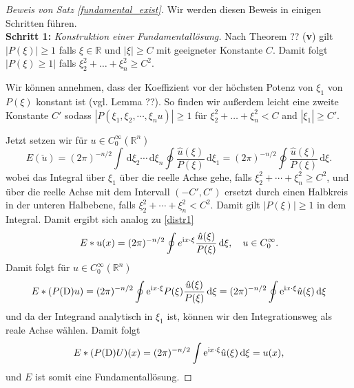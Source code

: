 \begin{proof}[Beweis von Satz \ref{fundamental_exist}]
Wir werden diesen Beweis in einigen Schritten führen.
\vspace{1mm}\\
\textbf{Schritt 1:} \emph{Konstruktion einer Fundamentallösung.}
Nach Theorem ?? ({\bf v}) gilt $|P(\xi)|\ge 1$ falls $\xi\in \mathbb R$ und $|\xi|\ge C$ mit geeigneter Konstante $C$.  Damit folgt $|P(\xi)\ge 1|$ falls $\xi_2^2+ \ldots + \xi_n^2 \ge C^2$.  

Wir können annehmen, dass der Koeffizient vor der höchsten Potenz von $\xi_1$ von $P(\xi)$ konstant ist (vgl. Lemma ??). 
So finden wir außerdem leicht eine zweite Konstante $C'$ sodass $|P(\xi_1, \xi_2, \cdots, \xi_nu)|\ge 1$ für $\xi_2^2+\ldots + \xi_n^2< C$ and $|\xi_1|\ge C'$.  

Jetzt setzen wir für $u\in C_0^\infty(\mathbb R^n)$
\begin{equation}\label{distr3}
E(\check u) = (2\pi)^{-n/2} \int \, \mathrm d\xi_2 \cdots \, \mathrm d\xi_n \oint \frac{\hat u(\xi)}{P(\xi)} \, \mathrm d\xi_1= (2\pi)^{-n/2} \oint \frac{\hat u(\xi)}{P(\xi)} \, \mathrm d\xi.
\end{equation}
wobei das Integral über $\xi_1$ über die reelle Achse gehe, falls $\xi_2^2+ \cdots + \xi_n^2 \ge C^2$, und über die reelle Achse mit dem Intervall $(-C', C')$ ersetzt durch einen Halbkreis in der unteren Halbebene, falls $\xi_2^2+ \cdots+ \xi_n^2 < C^2$. Damit gilt $|P(\xi)|\ge 1$  in dem Integral.  Damit ergibt sich analog zu \eqref{distr1}
\begin{equation}
E*u(x) = (2\pi)^{-n/2}\oint e^{\mathrm i x\cdot \xi } \frac{\hat u(\xi)}{P(\xi)}\, \mathrm d\xi, \quad u \in C_0^\infty.
\end{equation} 
Damit folgt für $u\in C_0^\infty(\mathbb R^n)$
\begin{equation}
E*(P(\mathrm D)u) = (2\pi)^{-n/2} \oint \mathrm e^{\mathrm i x\cdot\xi} P(\xi)  \frac{\hat{u} (\xi)}{P(\xi)}\, \mathrm d\xi=(2\pi)^{-n/2} \oint \mathrm e^{\mathrm i x\cdot \xi} \hat u(\xi) \, \mathrm d\xi
\end{equation}
und da der Integrand analytisch in $\xi_1$ ist, können wir den Integrationsweg als reale Achse wählen. Damit folgt
\begin{equation}
E*(P(\mathrm D) U)(x) = (2\pi)^{-n/2} \int \mathrm e^{\mathrm i x\cdot \xi} \hat u(\xi) \, \mathrm d\xi = u(x),
\end{equation}
und $E$ ist somit eine Fundamentallösung.


\end{proof}
